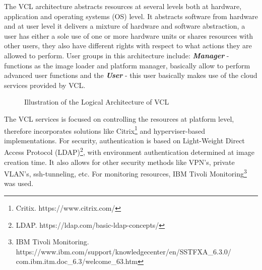 The VCL architecture abstracts resources at several levels both at hardware, application and operating systems (OS) level. It abstracts software from hardware and at user level it delivers a mixture of hardware and software abstraction, a user has either a sole use of one or more hardware units or shares resources with other users, they also have different rights with respect to what actions they are allowed to perform. User groups in this architecture include: \textbf{\textit{Manager}} - functions as the image loader and platform manager, basically allow to perform advanced user functions and the \textbf{\textit{User}} - this user basically makes use of the cloud services provided by VCL.
\begin{figure}[h]
\centering
{}
  \caption{Illustration of the Logical Architecture of VCL \cite{vouk2008powered}}
  \label{fig: logical_Architecture_of_VCL}
\end{figure}

The VCL services is focused on controlling the resources at platform level, therefore incorporates solutions like Citrix\footnote{Critix. https://www.citrix.com/} and hyperviser-based implementations. For security, authentication is based on Light-Weight Direct Access Protocol (LDAP)\footnote{LDAP. https://ldap.com/basic-ldap-concepts/}, with environment authentication determined at image creation time. It also allows for other security methods like VPN’s, private VLAN’s, ssh-tunneling, etc. For monitoring resources, IBM Tivoli Monitoring\footnote{IBM Tivoli Monitoring. https://www.ibm.com/support/knowledgecenter/en/SSTFXA\_6.3.0/\\com.ibm.itm.doc\_6.3/welcome\_63.htm} was used.

